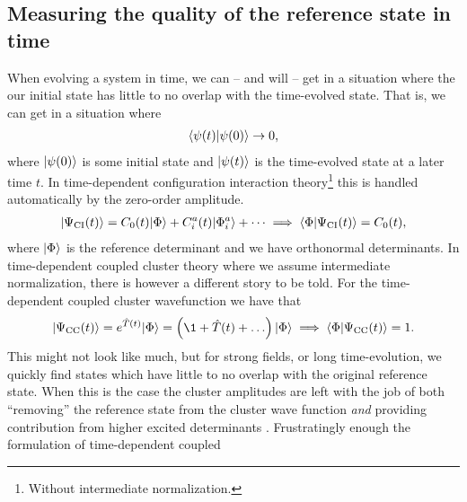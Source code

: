         \subsection{Measuring the quality of the reference state in time}
            When evolving a system in time, we can -- and will -- get in a
            situation where the our initial state has little to no overlap with
            the time-evolved state.
            That is, we can get in a situation where
            \begin{align}
                \langle \psi(t) | \psi(0) \rangle \to 0,
            \end{align}
            where $| \psi(0) \rangle$ is some initial state and $| \psi(t) \rangle$ is
            the time-evolved state at a later time $t$.
            In time-dependent configuration interaction theory\footnote{
                Without intermediate normalization.
            } this is handled automatically by the
            zero-order amplitude.
            \begin{gather}
                | \Psi_{\text{CI}}(t) \rangle = C_0(t)| \Phi \rangle + C^{a}_{i}(t)| \Phi^{a}_{i} \rangle + \dots
                \implies \langle \Phi | \Psi_{\text{CI}}(t) \rangle = C_0(t),
            \end{gather}
            where $| \Phi \rangle$ is the reference determinant and we have
            orthonormal determinants.
            In time-dependent coupled cluster theory where we assume
            intermediate normalization, there is however a different story to be
            told.
            For the time-dependent coupled cluster wavefunction we have that
            \begin{gather}
                \ket{\cc(t)} = e^{\clust(t)}\ketslat
                = \para{
                    \1
                    + \clust(t)
                    + \dots
                }\ketslat
                \implies
                \braket{\slat}{\cc(t)} = 1.
            \end{gather}
            This might not look like much, but for strong fields, or long
            time-evolution, we quickly find states which have little to no
            overlap with the original reference state.
            When this is the case the cluster amplitudes are left with the job
            of both ``removing'' the reference state from the cluster wave
            function \emph{and} providing contribution from higher excited
            determinants \cite{pedersen2018symplectic}.
            Frustratingly enough the formulation of time-dependent coupled

